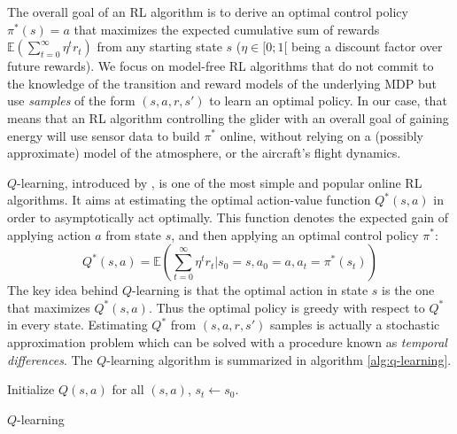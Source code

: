 \documentclass{jfpda}
\begin{document}
The overall goal of an RL algorithm is to derive an optimal control policy $\pi^*(s) = a$ that maximizes the expected cumulative sum of rewards $\mathbb{E}\left(\sum\limits_{t=0}^\infty \eta^t r_t\right)$ from any starting state $s$ ($\eta\in[0;1[$ being a discount factor over future rewards). We focus on model-free RL algorithms that do not commit to the knowledge of the transition and reward models of the underlying MDP but use \emph{samples} of the form $(s,a,r,s')$ to learn an optimal policy.
In our case, that means that an RL algorithm controlling the glider with an overall goal of gaining energy will use sensor data to build $\pi^*$ online, without relying on a (possibly approximate) model of the atmosphere, or the aircraft's flight dynamics. %

$Q$-learning, introduced by \cite{watkins92qlearning}, is one of the most simple and popular online RL algorithms. It aims at estimating the optimal action-value function $Q^*(s,a)$ in order to asymptotically act optimally. This function denotes the expected gain of applying action $a$ from state $s$, and then applying an optimal control policy $\pi^*$:
\begin{equation*}
Q^*(s,a) = \mathbb{E}\left(\sum\limits_{t=0}^\infty \eta^t r_t | s_0=s, a_0=a, a_t=\pi^*(s_t)\right)
\end{equation*}
The key idea behind $Q$-learning is that the optimal action in state $s$ is the one that maximizes $Q^*(s,a)$. Thus the optimal policy is greedy with respect to $Q^*$ in every state. Estimating $Q^*$ from $\left(s,a,r,s'\right)$ samples is actually a stochastic approximation problem which can be solved with a procedure known as \emph{temporal differences}. The $Q$-learning algorithm is summarized in algorithm \ref{alg:q-learning}.

\begin{algorithm2e}
\DontPrintSemicolon
Initialize $Q(s,a)$ for all $(s,a)$,\;{}
$s_{t} \leftarrow s_{0}$.\;
\caption{$Q$-learning}
\label{alg:q-learning}
\end{algorithm2e}
\end{document}
